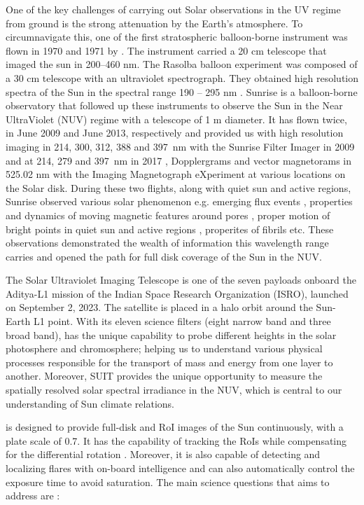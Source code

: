 One of the key challenges of carrying out Solar observations in the UV regime from ground is the strong attenuation by the Earth's atmosphere. To circumnavigate this, one of the first stratospheric balloon-borne instrument was flown in 1970 and 1971 by \cite{herse79}. The instrument carried a 20 cm telescope that imaged the sun in 200{--}460 nm. The Rasolba balloon experiment was composed of a 30 cm telescope with an ultraviolet spectrograph. They obtained high resolution spectra of the Sun in the spectral range 190 {--} 295 nm \citep{samain85,staath95}. Sunrise \citep{sunrise1,sunrise2} is a balloon-borne observatory that followed up these instruments to observe the Sun in the Near UltraViolet (NUV) regime with a telescope of 1 m diameter. It has flown twice, in June 2009 and June 2013, respectively and provided us with high resolution imaging in 214, 300, 312, 388 and 397~nm with the Sunrise Filter Imager \citep[SuFI,][]{sufi} in 2009 and at 214, 279 and 397~nm in 2017 \citep{sunrise2}, Dopplergrams and vector magnetorams in  525.02 nm with the Imaging Magnetograph eXperiment \citep[IMaX,][]{imax} at various locations on the Solar disk.  During these two flights, along with quiet sun and active regions, Sunrise observed various solar phenomenon e.g. emerging flux events \citep{centeno17}, properties and dynamics of moving magnetic features around pores \citep{kaithakkal17}, proper motion of bright points in quiet sun and active regions \citep{jafarzadeh17}, properites of fibrils \citep{gaferia17} etc. These observations demonstrated the wealth of information this wavelength range carries and opened the path for full disk coverage of the Sun in the NUV. 


The Solar Ultraviolet Imaging Telescope \citep[SUIT;][]{ghosh16,article} is one of the seven payloads onboard the Aditya-L1 mission \citep{adityal1, aditya} of the Indian Space Research Organization (ISRO), launched on September 2, 2023. The satellite is placed in a halo orbit around the Sun-Earth L1 point. With its eleven science filters (eight narrow band and three broad band), {\suit} has the unique capability to probe different heights in the solar photosphere and chromosphere; helping us to understand various physical processes responsible for the transport of mass and energy from one layer to another. Moreover, SUIT provides the unique opportunity to measure the spatially resolved solar spectral irradiance in the NUV, which is central to our understanding of Sun climate relations. 

{\suit} is designed to provide full-disk and RoI images of the Sun continuously, with a plate scale of 0.7{\arcsec}. It has the capability of tracking the RoIs while compensating for the differential rotation \citep{suit_algo}. Moreover, it is also capable of detecting and localizing flares with on-board intelligence and can also automatically control the exposure time to avoid saturation. The main science questions that {\suit} aims to address are \citep[][]{suit_science,suit_main}: 

